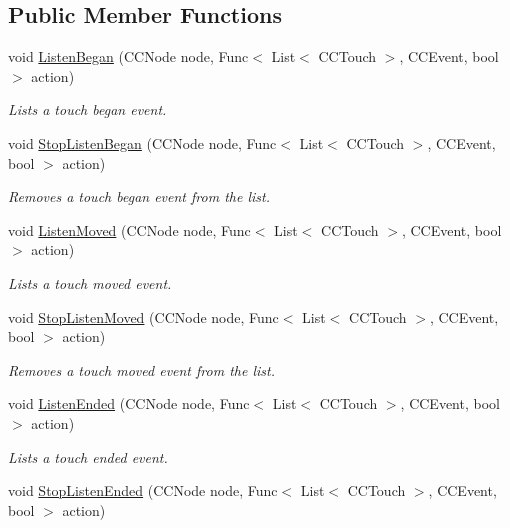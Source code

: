 \subsection*{Public Member Functions}
\begin{DoxyCompactItemize}
\item 
void \hyperlink{classClient_1_1Common_1_1Views_1_1TouchHandler_af5bb713f557a2639a2dd50aa1edda74a}{Listen\+Began} (C\+C\+Node node, Func$<$ List$<$ C\+C\+Touch $>$, C\+C\+Event, bool $>$ action)
\begin{DoxyCompactList}\small\item\em Lists a touch began event. \end{DoxyCompactList}\item 
void \hyperlink{classClient_1_1Common_1_1Views_1_1TouchHandler_ae3428734ec720799f2bacd4edb0748d2}{Stop\+Listen\+Began} (C\+C\+Node node, Func$<$ List$<$ C\+C\+Touch $>$, C\+C\+Event, bool $>$ action)
\begin{DoxyCompactList}\small\item\em Removes a touch began event from the list. \end{DoxyCompactList}\item 
void \hyperlink{classClient_1_1Common_1_1Views_1_1TouchHandler_a889760b6bd4835e1544aeccbf9878769}{Listen\+Moved} (C\+C\+Node node, Func$<$ List$<$ C\+C\+Touch $>$, C\+C\+Event, bool $>$ action)
\begin{DoxyCompactList}\small\item\em Lists a touch moved event. \end{DoxyCompactList}\item 
void \hyperlink{classClient_1_1Common_1_1Views_1_1TouchHandler_a169afc80080a0c44f69d858d54ff0f86}{Stop\+Listen\+Moved} (C\+C\+Node node, Func$<$ List$<$ C\+C\+Touch $>$, C\+C\+Event, bool $>$ action)
\begin{DoxyCompactList}\small\item\em Removes a touch moved event from the list. \end{DoxyCompactList}\item 
void \hyperlink{classClient_1_1Common_1_1Views_1_1TouchHandler_a26316a1e857db6026e022ad7c02f03dd}{Listen\+Ended} (C\+C\+Node node, Func$<$ List$<$ C\+C\+Touch $>$, C\+C\+Event, bool $>$ action)
\begin{DoxyCompactList}\small\item\em Lists a touch ended event. \end{DoxyCompactList}\item 
void \hyperlink{classClient_1_1Common_1_1Views_1_1TouchHandler_a6dd8a14f45c06af2e5ee30d69fd470f3}{Stop\+Listen\+Ended} (C\+C\+Node node, Func$<$ List$<$ C\+C\+Touch $>$, C\+C\+Event, bool $>$ action)

\end{DoxyCompactItemize}
